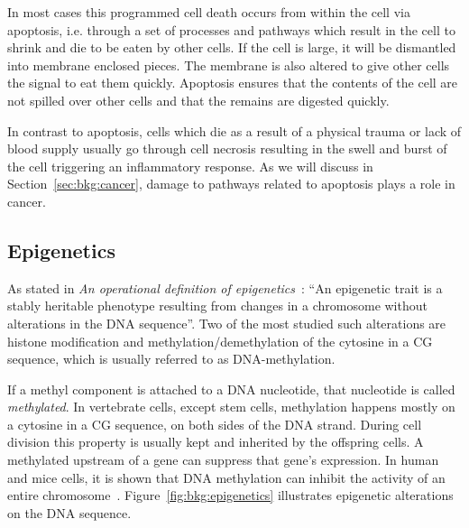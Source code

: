 In most cases this programmed cell death occurs from within the cell via apoptosis, i.e. through a set of processes and pathways which result in the cell to shrink and die to be eaten by other cells. If the cell is large, it will be dismantled into membrane enclosed pieces. The membrane is also altered to give other cells the signal to eat them quickly. Apoptosis ensures that the contents of the cell are not spilled over other cells and that the remains are digested quickly.

In contrast to apoptosis, cells which die as a result of a physical trauma or lack of blood supply usually go through cell necrosis resulting in the swell and burst of the cell triggering an inflammatory response. As we will discuss in Section~\ref{sec:bkg:cancer}, damage to pathways related to apoptosis plays a role in cancer.

\subsection{Epigenetics}
As stated in \emph{An operational definition of epigenetics}~\cite{berger2009operational}: ``An epigenetic trait is a stably heritable phenotype resulting from changes in a chromosome without alterations in the DNA sequence''. Two of the most studied such alterations are histone modification and methylation/demethylation of the cytosine in a CG sequence, which is usually referred to as DNA-methylation.

If a methyl component is attached to a DNA nucleotide, that nucleotide is called \emph{methylated}. In vertebrate cells, except stem cells, methylation happens mostly on a cytosine in a CG sequence, on both sides of the DNA strand. During cell division this property is usually kept and inherited by the offspring cells. A methylated upstream of a gene can suppress that gene's expression. In human and mice cells, it is shown that DNA methylation can inhibit the activity of an entire chromosome~\cite[Ch. 7]{the-cell}. Figure~\ref{fig:bkg:epigenetics} illustrates epigenetic alterations on the DNA sequence.

